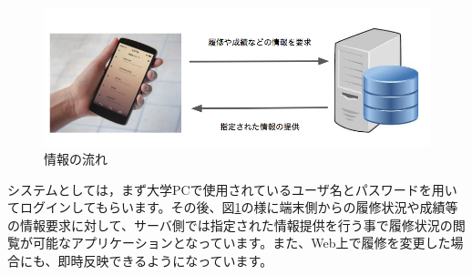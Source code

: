 \begin{figure}[h]
\includegraphics[scale = 0.5]{./nagare.png}
\caption{情報の流れ}
\label{flow}
\end{figure}

システムとしては，まず大学PCで使用されているユーザ名とパスワードを用いてログインしてもらいます。その後、図\ref{flow}の様に端末側からの履修状況や成績等の情報要求に対して、サーバ側では指定された情報提供を行う事で履修状況の閲覧が可能なアプリケーションとなっています。また、Web上で履修を変更した場合にも、即時反映できるようになっています。
